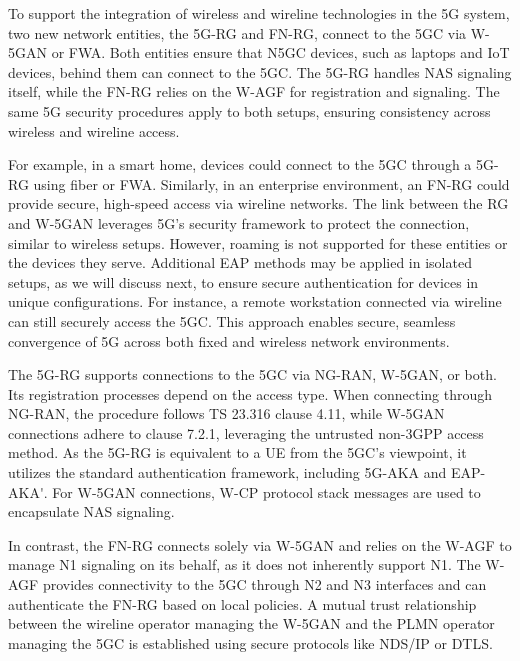 To support the integration of wireless and wireline technologies in the \ac{5G} system, two new network entities, the \ac{5G-RG} and \ac{FN-RG}, connect to the \ac{5GC} via \ac{W-5GAN} or \ac{FWA}. Both entities ensure that \ac{N5GC} devices, such as laptops and \ac{IoT} devices, behind them can connect to the \ac{5GC}. The \ac{5G-RG} handles \ac{NAS} signaling itself, while the \ac{FN-RG} relies on the \ac{W-AGF} for registration and signaling. The same \ac{5G} security procedures apply to both setups, ensuring consistency across wireless and wireline access.

For example, in a smart home, devices could connect to the \ac{5GC} through a \ac{5G-RG} using fiber or \ac{FWA}. Similarly, in an enterprise environment, an \ac{FN-RG} could provide secure, high-speed access via wireline networks. The link between the \ac{RG} and \ac{W-5GAN} leverages \ac{5G}’s security framework to protect the connection, similar to wireless setups. However, roaming is not supported for these entities or the devices they serve. Additional \ac{EAP} methods may be applied in isolated setups, as we will discuss next, to ensure secure authentication for devices in unique configurations. For instance, a remote workstation connected via wireline can still securely access the \ac{5GC}. This approach enables secure, seamless convergence of \ac{5G} across both fixed and wireless network environments.

The \ac{5G-RG} supports connections to the \ac{5GC} via \ac{NG-RAN}, \ac{W-5GAN}, or both. Its registration processes depend on the access type. When connecting through \ac{NG-RAN}, the procedure follows TS 23.316 clause 4.11, while \ac{W-5GAN} connections adhere to clause 7.2.1, leveraging the untrusted non-\ac{3GPP} access method. As the \ac{5G-RG} is equivalent to a \ac{UE} from the \ac{5GC}’s viewpoint, it utilizes the standard authentication framework, including \ac{5G-AKA} and \ac{EAP-AKA'}. For \ac{W-5GAN} connections, \ac{W-CP} protocol stack messages are used to encapsulate \ac{NAS} signaling.

In contrast, the \ac{FN-RG} connects solely via \ac{W-5GAN} and relies on the \ac{W-AGF} to manage N1 signaling on its behalf, as it does not inherently support N1. The \ac{W-AGF} provides connectivity to the \ac{5GC} through N2 and N3 interfaces and can authenticate the \ac{FN-RG} based on local policies. A mutual trust relationship between the wireline operator managing the \ac{W-5GAN} and the \ac{PLMN} operator managing the \ac{5GC} is established using secure protocols like \ac{NDS/IP} or \ac{DTLS}.

